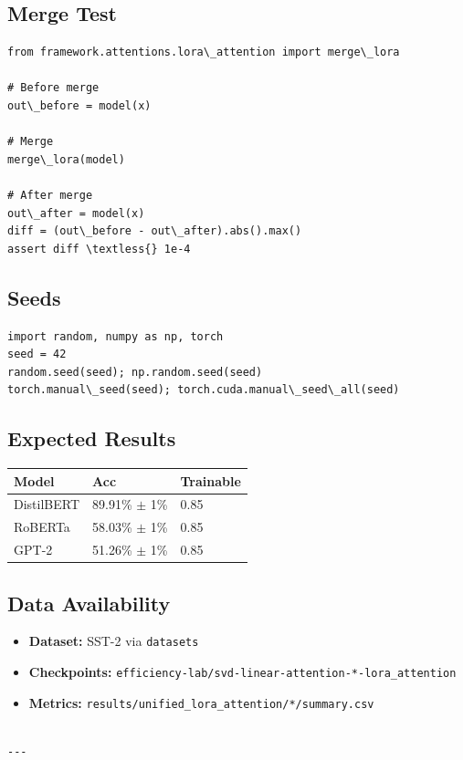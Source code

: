 \subsection{Merge Test}

\begin{lstlisting}
from framework.attentions.lora\_attention import merge\_lora

# Before merge
out\_before = model(x)

# Merge
merge\_lora(model)

# After merge
out\_after = model(x)
diff = (out\_before - out\_after).abs().max()
assert diff \textless{} 1e-4
\end{lstlisting}

\subsection{Seeds}

\begin{lstlisting}
import random, numpy as np, torch
seed = 42
random.seed(seed); np.random.seed(seed)
torch.manual\_seed(seed); torch.cuda.manual\_seed\_all(seed)
\end{lstlisting}

\subsection{Expected Results}

\begin{table}[H]
\centering
\small
\begin{tabular}{lll}
\toprule
\textbf{Model} & \textbf{Acc} & \textbf{Trainable} \\
\midrule
DistilBERT & 89.91\% $\pm$ 1\% & 0.85 \\
RoBERTa & 58.03\% $\pm$ 1\% & 0.85 \\
GPT-2 & 51.26\% $\pm$ 1\% & 0.85 \\
\bottomrule
\end{tabular}
\end{table}

\subsection{Data Availability}

\begin{itemize}
\item \textbf{Dataset:} SST-2 via \texttt{datasets}
\item \textbf{Checkpoints:} \texttt{efficiency-lab/svd-linear-attention-*-lora\_attention}
\item \textbf{Metrics:} \texttt{results/unified\_lora\_attention/*/summary.csv}
\end{itemize}
\begin{lstlisting}

---
\end{lstlisting}

